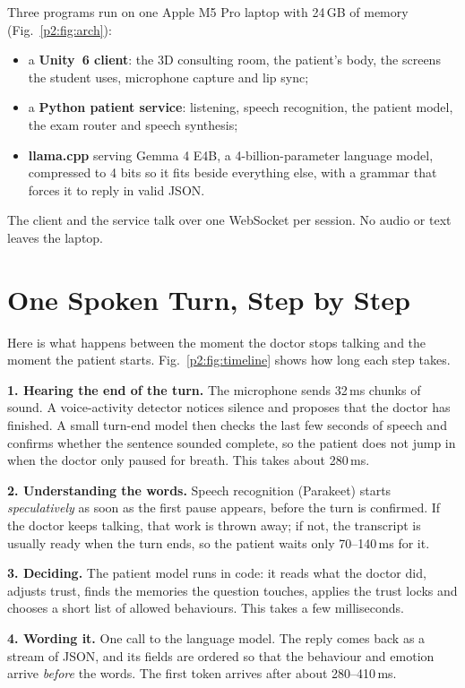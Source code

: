 \documentclass[journal]{IEEEtran}
\begin{document}
Three programs run on one Apple M5 Pro laptop with 24\,GB of memory (Fig.~\ref{p2:fig:arch}):
\begin{itemize}
\item a \textbf{Unity~6 client}: the 3D consulting room, the patient's body, the screens the student uses, microphone capture and lip sync;
\item a \textbf{Python patient service}: listening, speech recognition, the patient model, the exam router and speech synthesis;
\item \textbf{llama.cpp} \cite{llamacpp} serving Gemma 4 E4B, a 4-billion-parameter language model, compressed to 4 bits so it fits beside
everything else, with a grammar that forces it to reply in valid JSON.
\end{itemize}
The client and the service talk over one WebSocket per session. No audio or text leaves the laptop.

\section{One Spoken Turn, Step by Step}
Here is what happens between the moment the doctor stops talking and the moment the patient starts. Fig.~\ref{p2:fig:timeline} shows how long
each step takes.

\textbf{1. Hearing the end of the turn.} The microphone sends 32\,ms chunks of sound. A voice-activity detector notices silence and proposes
that the doctor has finished. A small turn-end model then checks the last few seconds of speech and confirms whether the sentence sounded
complete, so the patient does not jump in when the doctor only paused for breath. This takes about 280\,ms.

\textbf{2. Understanding the words.} Speech recognition (Parakeet) starts \emph{speculatively} as soon as the first pause appears, before the
turn is confirmed. If the doctor keeps talking, that work is thrown away; if not, the transcript is usually ready when the turn ends, so the
patient waits only 70--140\,ms for it.

\textbf{3. Deciding.} The patient model runs in code: it reads what the doctor did, adjusts trust, finds the memories the question touches,
applies the trust locks and chooses a short list of allowed behaviours. This takes a few milliseconds.

\textbf{4. Wording it.} One call to the language model. The reply comes back as a stream of JSON, and its fields are ordered so that the
behaviour and emotion arrive \emph{before} the words. The first token arrives after about 280--410\,ms.
\end{document}
